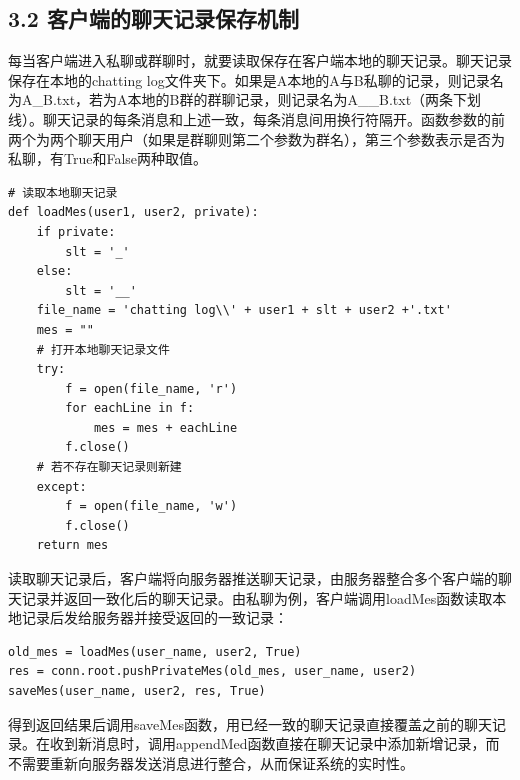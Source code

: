 \documentclass{report}
\begin{document}
\subsection*{3.2 客户端的聊天记录保存机制}
每当客户端进入私聊或群聊时，就要读取保存在客户端本地的聊天记录。聊天记录保存在本地的chatting log文件夹下。如果是A本地的A与B私聊的记录，则记录名为A\_B.txt，若为A本地的B群的群聊记录，则记录名为A\_\_B.txt（两条下划线）。聊天记录的每条消息和上述一致，每条消息间用换行符隔开。函数参数的前两个为两个聊天用户（如果是群聊则第二个参数为群名），第三个参数表示是否为私聊，有True和False两种取值。
\begin{lstlisting}
# 读取本地聊天记录
def loadMes(user1, user2, private):
    if private:
        slt = '_'
    else:
        slt = '__'
    file_name = 'chatting log\\' + user1 + slt + user2 +'.txt'
    mes = ""
    # 打开本地聊天记录文件
    try:
        f = open(file_name, 'r')
        for eachLine in f:
            mes = mes + eachLine
        f.close()
    # 若不存在聊天记录则新建
    except:
        f = open(file_name, 'w')
        f.close()
    return mes
\end{lstlisting}
读取聊天记录后，客户端将向服务器推送聊天记录，由服务器整合多个客户端的聊天记录并返回一致化后的聊天记录。由私聊为例，客户端调用loadMes函数读取本地记录后发给服务器并接受返回的一致记录：
\begin{lstlisting}
old_mes = loadMes(user_name, user2, True)
res = conn.root.pushPrivateMes(old_mes, user_name, user2)
saveMes(user_name, user2, res, True)
\end{lstlisting}
得到返回结果后调用saveMes函数，用已经一致的聊天记录直接覆盖之前的聊天记录。在收到新消息时，调用appendMed函数直接在聊天记录中添加新增记录，而不需要重新向服务器发送消息进行整合，从而保证系统的实时性。
\end{document}

